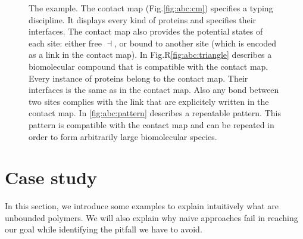 \documentclass{entcs}
\newcommand{\freesymbol}{\dashv}
\begin{document}
\begin{figure}
\caption{The  example.
The contact map  (Fig.\ref{fig:abc:cm}) specifies a typing discipline.
It displays every kind of proteins and specifies their interfaces.
The contact map also provides the potential states of each site:
either free $\freesymbol$, or bound to another site (which is encoded as a link in the contact map).
In Fig.R\ref{fig:abc:triangle} describes a biomolecular compound that is compatible with the contact map. Every instance of proteins belong to the contact map. Their interfaces is the same as in the contact map.
Also any bond between two sites complies with the link that are explicitely written in the contact map.
In \ref{fig:abc:pattern} describes a repeatable pattern.
This pattern is compatible with the contact map and can be repeated in order to form arbitrarily large biomolecular species.
}
\end{figure}
\section{Case study}
\label{sec:case-study}

In this section, we introduce some examples to explain intuitively what are unbounded polymers. We will also explain why naive approaches fail in reaching our goal while identifying the pitfall we have to avoid.
\end{document}
